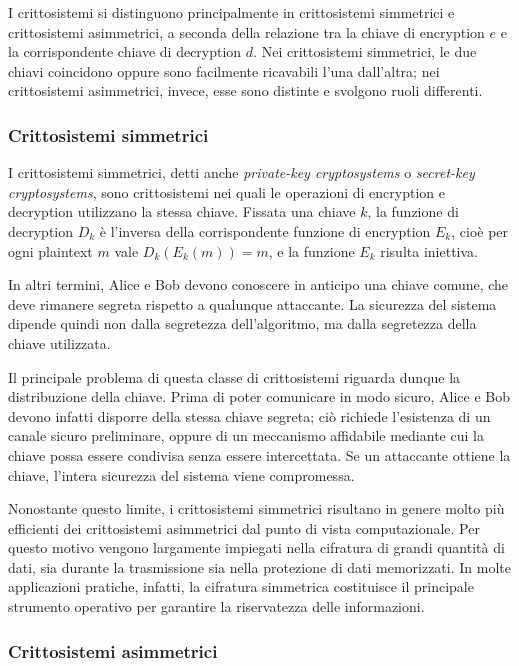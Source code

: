 I crittosistemi si distinguono principalmente in crittosistemi simmetrici e crittosistemi asimmetrici, a seconda della
relazione tra la chiave di encryption $e$ e la corrispondente chiave di decryption $d$. Nei crittosistemi simmetrici,
le due chiavi coincidono oppure sono facilmente ricavabili l'una dall'altra; nei crittosistemi asimmetrici, invece,
esse sono distinte e svolgono ruoli differenti.

\subsubsection{Crittosistemi simmetrici}

I crittosistemi simmetrici, detti anche \emph{private-key cryptosystems} o \emph{secret-key cryptosystems}, sono
crittosistemi nei quali le operazioni di encryption e decryption utilizzano la stessa chiave. Fissata una chiave $k$,
la funzione di decryption $D_k$ è l'inversa della corrispondente funzione di encryption $E_k$, cioè per ogni plaintext
$m$ vale $D_k(E_k(m)) = m$, e la funzione $E_k$ risulta iniettiva.

In altri termini, Alice e Bob devono conoscere in anticipo una chiave comune, che deve rimanere segreta rispetto a
qualunque attaccante. La sicurezza del sistema dipende quindi non dalla segretezza dell'algoritmo, ma dalla segretezza
della chiave utilizzata.

Il principale problema di questa classe di crittosistemi riguarda dunque la distribuzione della chiave. Prima di poter
comunicare in modo sicuro, Alice e Bob devono infatti disporre della stessa chiave segreta; ciò richiede l'esistenza di
un canale sicuro preliminare, oppure di un meccanismo affidabile mediante cui la chiave possa essere condivisa senza
essere intercettata. Se un attaccante ottiene la chiave, l'intera sicurezza del sistema viene compromessa.

Nonostante questo limite, i crittosistemi simmetrici risultano in genere molto più efficienti dei crittosistemi
asimmetrici dal punto di vista computazionale. Per questo motivo vengono largamente impiegati nella cifratura di grandi
quantità di dati, sia durante la trasmissione sia nella protezione di dati memorizzati. In molte applicazioni pratiche,
infatti, la cifratura simmetrica costituisce il principale strumento operativo per garantire la riservatezza delle
informazioni.

\newpage

\subsubsection{Crittosistemi asimmetrici}

